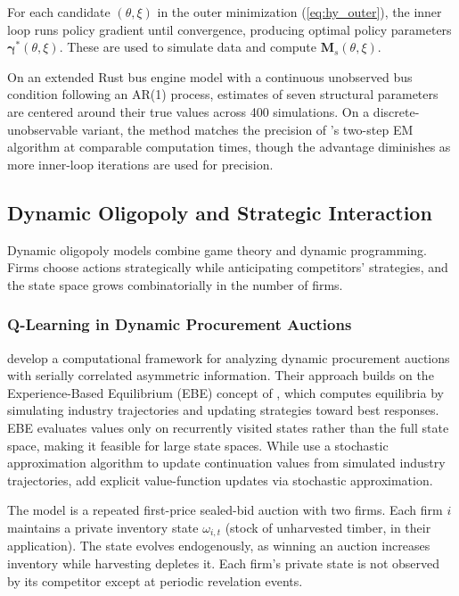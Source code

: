 For each candidate $(\theta, \xi)$ in the outer minimization (\ref{eq:hy_outer}), the inner loop runs policy gradient until convergence, producing optimal policy parameters $\boldsymbol{\gamma}^*(\theta, \xi)$. These are used to simulate data and compute $\mathbf{M}_s(\theta, \xi)$.

On an extended Rust bus engine model with a continuous unobserved bus condition following an AR(1) process, estimates of seven structural parameters are centered around their true values across 400 simulations. On a discrete-unobservable variant, the method matches the precision of \citet{ArcidiaconoMiller2011}'s two-step EM algorithm at comparable computation times, though the advantage diminishes as more inner-loop iterations are used for precision.


\subsection{Dynamic Oligopoly and Strategic Interaction}

Dynamic oligopoly models combine game theory and dynamic programming. Firms choose actions strategically while anticipating competitors' strategies, and the state space grows combinatorially in the number of firms.


\subsubsection{Q-Learning in Dynamic Procurement Auctions}

\citet{AskerEtAl2020} develop a computational framework for analyzing dynamic procurement auctions with serially correlated asymmetric information. Their approach builds on the Experience-Based Equilibrium (EBE) concept of \citet{FershtmanPakes2012}, which computes equilibria by simulating industry trajectories and updating strategies toward best responses. EBE evaluates values only on recurrently visited states rather than the full state space, making it feasible for large state spaces. While \citet{FershtmanPakes2012} use a stochastic approximation algorithm to update continuation values from simulated industry trajectories, \citet{AskerEtAl2020} add explicit value-function updates via stochastic approximation.

The model is a repeated first-price sealed-bid auction with two firms. Each firm $i$ maintains a private inventory state $\omega_{i,t}$ (stock of unharvested timber, in their application). The state evolves endogenously, as winning an auction increases inventory while harvesting depletes it. Each firm's private state is not observed by its competitor except at periodic revelation events.

